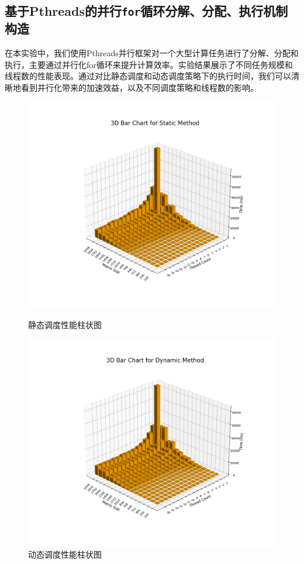 \documentclass[a4paper, utf8]{ctexart}
\begin{document}
	\subsection{基于Pthreads的并行\texttt{for}循环分解、分配、执行机制构造}
	
	在本实验中，我们使用Pthreads并行框架对一个大型计算任务进行了分解、分配和执行，主要通过并行化for循环来提升计算效率。实验结果展示了不同任务规模和线程数的性能表现。通过对比静态调度和动态调度策略下的执行时间，我们可以清晰地看到并行化带来的加速效益，以及不同调度策略和线程数的影响。
	
	\begin{figure}[htbp]
		\centering
		\begin{minipage}{.45\textwidth}
			\centering
			\includegraphics[width=.8\textwidth]{./figure/static_barchart.png}
			\caption{静态调度性能柱状图}
		\end{minipage}
		\begin{minipage}{.45\textwidth}
			\centering
			\includegraphics[width=.8\textwidth]{./figure/dynamic_barchart.png}
			\caption{动态调度性能柱状图}
		\end{minipage}
	\end{figure}
	
\end{document}
